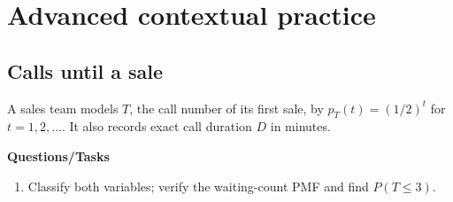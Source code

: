 \section{Advanced contextual practice}\label{sec:t2-c1-advanced}
\subsection{Calls until a sale}
A sales team models $T$, the call number of its first sale, by $p_T(t)=(1/2)^t$ for $t=1,2,\ldots$. It also records exact call duration $D$ in minutes.

\textbf{Questions/Tasks}
\begin{enumerate}
\item Classify both variables; verify the waiting-count PMF and find $P(T\leq3)$.
\end{enumerate}
